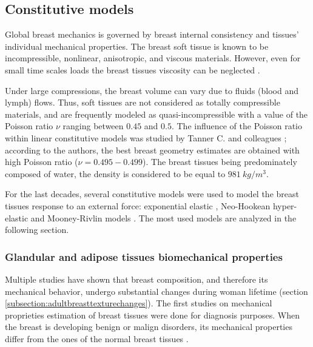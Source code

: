 \subsection{Constitutive models}

Global breast mechanics is governed by breast internal consistency and tissues' individual mechanical properties. The breast soft tissue is known to be incompressible, nonlinear, anisotropic, and viscous materials. However, even for small time scales loads the breast tissues viscosity can be neglected \citep{wellman_breast_1999}.  

Under large compressions, the breast volume can vary due to fluids (blood and lymph) flows. Thus, soft tissues are not considered as totally compressible materials, and are frequently modeled as quasi-incompressible with a value of the Poisson ratio $\nu$ ranging between $0.45$ and $0.5$. The influence of the Poisson ratio within linear constitutive models was studied by Tanner C. and colleagues \citep{tanner_factors_2006}; according to the authors, the best breast geometry estimates are obtained with high Poisson ratio ($\nu = {0.495-0.499}$). The breast tissues being predominately composed of water, the density is considered to be equal to $981\ kg/m^3$.  


For the last decades, several constitutive models were used to model the breast tissues response to an external force: exponential elastic \citep{azar_methods_2002}, Neo-Hookean hyper-elastic \citep{carter_biomechanical_2009,rajagopal_modeling_2010,sturgeon_finite_element_2016, eiben_breast_2016, han_nonlinear_2014, garcia_mapping_2017} and Mooney-Rivlin models \citep{samani_elastic_2007,tanner_factors_2006,carter_application_2012,martinez_finite_2017}. 
The most used models are analyzed in the following section.
 
\subsubsection*{Glandular and adipose tissues biomechanical properties }
 Multiple studies have shown that breast composition, and therefore its mechanical behavior, undergo substantial changes during woman lifetime (section \ref{subsection:adultbreasttexturechanges}). The first studies on mechanical proprieties estimation of breast tissues were done for diagnosis purposes. When the breast is developing benign or malign disorders, its mechanical properties differ from the ones of the normal breast tissues \citep{krouskop_elastic_1998}.  

